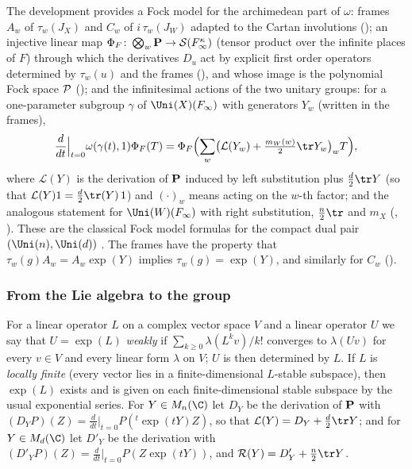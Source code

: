 The development provides a Fock model for the archimedean part of $\omega$: frames $A_w$ of $\tau_w(J_X)$ and $C_w$ of
$i\,\tau_w(J_W)$ adapted to the Cartan involutions (); an injective linear map
$\Phi_F\colon\bigotimes_w\mathbf{P}\to\mathcal{S}(F_\infty^\kappa)$ (tensor product over the infinite places of $F$) through which
the derivatives $D_u$ act by explicit first order operators determined by $\tau_w(u)$ and the frames
(), and whose image is the polynomial Fock space $\mathcal{P}$
(); and the infinitesimal actions of the two unitary groups:
for a one-parameter subgroup $\gamma$ of $\Uni(X)(F_\infty)$ with generators $Y_w$ (written in the frames),
\[
  \frac{d}{dt}\Big|_{t=0}\omega(\gamma(t),1)\Phi_F(T)=\Phi_F\Bigl(\sum_w\bigl(\mathcal L(Y_w)+\tfrac{m_W(w)}2\tr Y_w\bigr)_wT\Bigr),
\]
where $\mathcal L(Y)$ is the derivation of $\mathbf{P}$ induced by left substitution plus $\frac d2\tr Y$ (so that
$\mathcal L(Y)1=\frac d2\tr(Y)\,1$) and $(\cdot)_w$ means acting on the $w$-th factor; and the analogous statement for
$\Uni(W)(F_\infty)$ with right substitution, $\frac n2\tr$ and $m_X$
(, ). These are the
classical Fock model formulas for the compact dual pair $(\Uni(n),\Uni(d))$ \cite{KashiwaraVergne1978,Howe1989}.
The frames have the property that $\tau_w(g)A_w=A_w\exp(Y)$ implies $\tau_w(g)=\exp(Y)$, and similarly for $C_w$
().

\subsubsection*{From the Lie algebra to the group}
For a linear operator $L$ on a complex vector space $V$ and a linear operator $U$ we say that $U=\exp(L)$ \emph{weakly} if
$\sum_{k\ge0}\lambda(L^kv)/k!$ converges to $\lambda(Uv)$ for every $v\in V$ and every linear form $\lambda$ on $V$; $U$ is then determined by $L$.
If $L$ is \emph{locally finite} (every vector lies in a finite-dimensional $L$-stable subspace), then $\exp(L)$ exists and is
given on each finite-dimensional stable subspace by the usual exponential series. For $Y\in M_n(\C)$ let $D_Y$ be the derivation
of $\mathbf{P}$ with $(D_YP)(Z)=\frac d{dt}\big|_{t=0}P({}^t\exp(tY)Z)$, so that $\mathcal L(Y)=D_Y+\frac d2\tr Y$; and for
$Y\in M_d(\C)$ let $D'_Y$ be the derivation with $(D'_YP)(Z)=\frac d{dt}\big|_{t=0}P(Z\exp(tY))$, and $\mathcal R(Y)=D'_Y+\frac n2\tr Y$.

